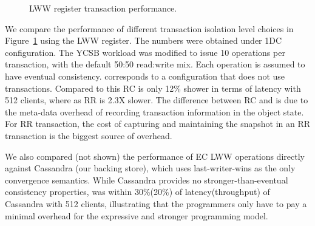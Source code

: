 \begin{figure}[t]
  \centering
	\caption{LWW register transaction performance.}
  \label{grf:LWW-txn}
\end{figure}

We compare the performance of different transaction isolation level choices in
Figure~\ref{grf:LWW-txn} using the LWW register. The numbers were obtained
under 1DC configuration. The YCSB workload was modified to issue 10 operations
per transaction, with the default 50:50 read:write mix. Each operation is
assumed to have eventual consistency.  corresponds to a configuration
that does not use transactions. Compared to this RC is only 12\% shower in
terms of latency with 512 clients, where as RR is 2.3X slower. The difference
between RC and  is due to the meta-data overhead of recording
transaction information in the object state. For RR transaction, the cost of
capturing and maintaining the snapshot in an RR transaction is the biggest
source of overhead.

We also compared (not shown) the performance of EC LWW operations directly
against Cassandra (our backing store), which uses last-writer-wins as the only
convergence semantics. While Cassandra provides no stronger-than-eventual
consistency properties, \quelea was within 30\%(20\%) of latency(throughput) of
Cassandra with 512 clients, illustrating that the programmers only have to pay
a minimal overhead for the expressive and stronger \quelea programming model.

